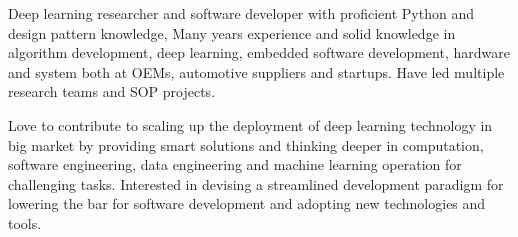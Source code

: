 \documentclass[../resume_xin.tex]{subfiles}
\begin{document}


\begin{cvparagraph}

Deep learning researcher and software developer with proficient Python and design pattern knowledge, Many years experience and solid knowledge in algorithm development, deep learning, embedded software development, hardware and system both at OEMs, automotive suppliers and startups. Have led multiple research teams and SOP projects.

Love to contribute to scaling up the deployment of deep learning technology in big market by providing smart solutions and thinking deeper in computation, software engineering, data engineering and machine learning operation for challenging tasks. Interested in devising a streamlined development paradigm for lowering the bar for software development and adopting new technologies and tools.

\end{cvparagraph}
\end{document}
